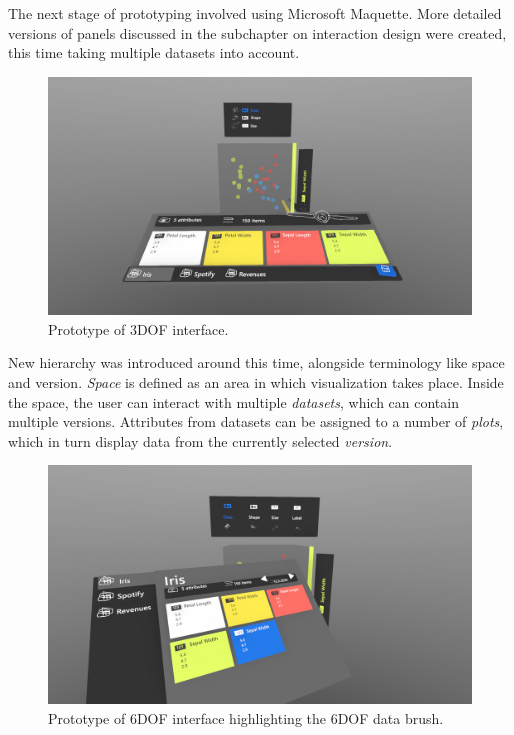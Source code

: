\documentclass[thesis=M,english,hidelinks]{FITthesisXE}[2012/06/26]
\begin{document}
The next stage of prototyping involved using Microsoft Maquette.\autocite{msmaquette} More detailed versions of panels discussed in the subchapter on interaction design were created, this time taking multiple datasets into account.

\begin{figure}[ht]
\centering
\includegraphics[scale=0.15]{maquette_databrush_3dof}
\caption{Prototype of 3DOF interface.}
\label{fig:maquette_databrush_3dof}
\end{figure}

New hierarchy was introduced around this time, alongside terminology like space and version. \emph{Space} is defined as an area in which visualization takes place. Inside the space, the user can interact with multiple \emph{datasets}, which can contain multiple versions. Attributes from datasets can be assigned to a number of \emph{plots}, which in turn display data from the currently selected 
\emph{version}.

\begin{figure}[ht]
\centering
\includegraphics[scale=0.15]{maquette_databrush_6dof}
\caption{Prototype of 6DOF interface highlighting the 6DOF data brush.}
\label{fig:maquette_databrush_6dof}
\end{figure}
\end{document}
